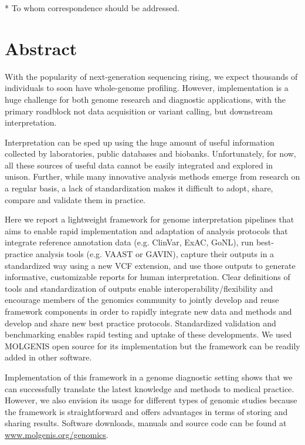\noindent
* To whom correspondence should be addressed.

\section*{Abstract}

With the popularity of next-generation sequencing rising, we expect thousands of individuals to soon have whole-genome profiling.
However,  implementation is a huge challenge for both genome research and diagnostic applications, with the primary roadblock not data acquisition or variant calling, but downstream interpretation.

Interpretation can be sped up using the huge amount of useful information collected by laboratories, public databases and biobanks. Unfortunately, for now, all these sources of useful data cannot be easily integrated and explored in unison. Further, while many innovative analysis methods emerge from research on a regular basis, a lack of standardization makes it difficult to adopt, share, compare and validate them in practice.

Here we report a lightweight framework for genome interpretation pipelines that aims to enable rapid implementation and adaptation of analysis protocols that integrate reference annotation data (e.g. ClinVar, ExAC, GoNL), run best-practice analysis tools (e.g. VAAST or GAVIN), capture their outputs in a standardized way using a new VCF extension, and use those outputs to generate informative, customizable reports for human interpretation.
Clear definitions of tools and standardization of outputs enable interoperability/flexibility and encourage members of the genomics community to jointly develop and reuse framework components in order to rapidly integrate new data and methods and develop and share new best practice protocols.
Standardized validation and benchmarking enables rapid testing and uptake of these developments.
We used MOLGENIS open source for its implementation but the framework can be readily added in other software.

Implementation of this framework in a genome diagnostic setting shows that we can successfully translate the latest knowledge and methods to medical practice.
However, we also envision its usage for different types of genomic studies because the framework is straightforward and offers advantages in terms of storing and sharing results.
Software downloads, manuals and source code can be found at \url{www.molgenis.org/genomics}.


